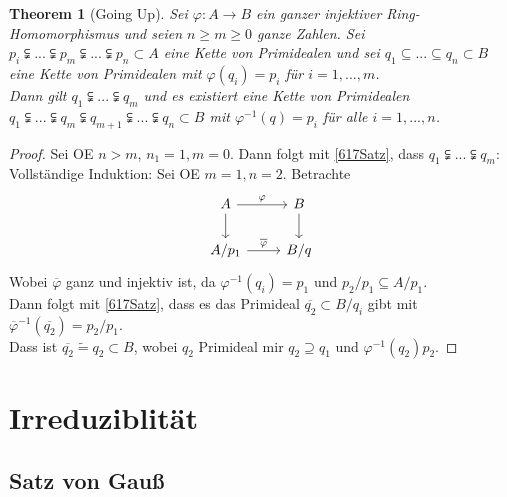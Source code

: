 \documentclass[10pt,a4paper]{article}
\newcommand{\ol}[1]{\overline{#1}}
\newcommand{\isomorph}{\ensuremath{\tilde{=}}}
\newcounter{thm}[section]
\theoremstyle{definition}
\theoremstyle{plain}
\newtheorem{theorem}[thm]{Theorem}
\theoremstyle{remark}
\begin{document}
\begin{theorem}[Going Up]\label{618ThmGoingUp}
	Sei $\varphi:A\rightarrow B$ ein ganzer injektiver Ring-Homomorphismus und seien $n\geq m\geq 0$ ganze Zahlen. Sei $p_i\subsetneqq...\subsetneqq p_m\subsetneqq...\subsetneqq p_n\subset A$ eine Kette von Primidealen und sei $q_1\subseteq...\subseteq q_n\subset B$ eine Kette von Primidealen mit $\varphi(q_i)=p_i$ für $i=1,...,m$.\\
	Dann gilt $q_1\subsetneqq...\subsetneqq q_m$ und es existiert eine Kette von Primidealen $q_1\subsetneqq...\subsetneqq q_m\subsetneqq q_{m+1}\subsetneqq...\subsetneqq q_n\subset B$ mit $\varphi^{-1}(q)=p_i$ für alle $i=1,...,n$.
\end{theorem}
\begin{proof}
	Sei OE $n>m$, $n_1=1,m=0$. Dann folgt mit \ref{617Satz}, dass $q_1\subsetneqq...\subsetneqq q_m$:\\
	Vollständige Induktion: Sei OE $m=1,n=2$. Betrachte
	\[
	\begin{tikzcd}
	A\ar[r,"\varphi"] \ar[d] & B\ar[d]\\
	A/p_1 \ar[r,"\ol{\varphi}"] & B/q
	\end{tikzcd}
	\]
	Wobei $\ol\varphi$ ganz und injektiv ist, da $\varphi^{-1}(q_i)=p_1$ und $p_2/p_1\subseteq A/p_1$.\\
	Dann folgt mit \ref{617Satz}, dass es das Primideal $\ol{q_2}\subset B/q_i$ gibt mit $\ol{\varphi}^{-1}(\ol{q_2})=p_2/p_1$.\\
	Dass ist $\ol{q_2}\isomorph q_2\subset B$, wobei $q_2$ Primideal mir $q_2\supseteq q_1$ und $\varphi^{-1}(q_2)p_2$. 
\end{proof}



\section{Irreduziblität}
\subsection{Satz von Gauß}
\end{document}
